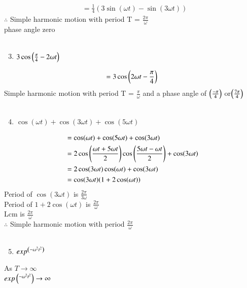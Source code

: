 \documentclass[journal,12pt,twocolumn]{IEEEtran}
\theoremstyle{remark}
\begin{document}
 \begin{align}
  &=\frac{1}{4}(3\sin(\omega t)-\sin(3 \omega t))
 \end{align}
 $\therefore$  Simple harmonic motion with period {T} = $\frac{2\pi}{\omega}$ \\
  phase angle zero\\
\\
\begin{enumerate}
 \setcounter{enumi}{2} 
    \item $3\cos\left(\frac{\pi}{4}-2\omega t\right)$\\
\end{enumerate}
 \begin{align}
  =3\cos\left(2\omega t-\frac{\pi}{4}\right)\\
 \end{align}
 Simple harmonic motion with period {T} = $\frac{\pi}{\omega}$  and a phase angle of  $\left(\frac{-\pi}{4}\right)$ or$\left(\frac{7\pi}{4}\right)$\\
 \\
 \begin{enumerate}
 \setcounter{enumi}{3} 
    \item  $\cos(\omega t)+\cos(3\omega t)+\cos(5\omega t)$\\
\end{enumerate}
 \begin{align}
  &=\cos(\omega t)+\cos(5\omega t)+\cos(3\omega t)\\
  &=2\cos\left(\frac{\omega t+5\omega t}{2}\right)\cos\left(\frac{5\omega t-\omega t}{2}\right) +\cos(3\omega t)\\
  &=2\cos(3\omega t) \cos(\omega t)+\cos(3\omega t)\\
  &=\cos(3\omega t) (1+2\cos(\omega t))
 \end{align}
 Period of $\cos(3\omega t)$ is $\frac{2\pi}{3\omega}$\\ 
 Period of $1+2\cos(\omega t)$ is $\frac{2\pi}{\omega}$\\ 
 Lcm is $\frac{2\pi}{\omega}$\\
 $\therefore$  Simple harmonic motion with period $\frac{2\pi}{\omega}$\\
 \\
 \begin{enumerate}
 \setcounter{enumi}{4} 
    \item  $exp^{\left(-\omega^2t^2\right)}$\\
\end{enumerate}
       \begin{center}
     As $T\to\infty$\\
    $exp\left(^{-\omega^2t^2}\right) \to \infty$\\ 
       \end{center}
\end{document}

